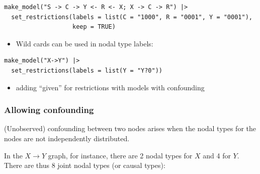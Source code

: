 \documentclass[
  article]{jss}
\providecommand{\tightlist}{%
  \setlength{\itemsep}{0pt}\setlength{\parskip}{0pt}}\usepackage{longtable,booktabs,array}
\begin{document}
\begin{verbatim}
make_model("S -> C -> Y <- R <- X; X -> C -> R") |>
  set_restrictions(labels = list(C = "1000", R = "0001", Y = "0001"), 
                   keep = TRUE)
\end{verbatim}

\begin{itemize}
\tightlist
\item
  Wild cards can be used in nodal type labels:
\end{itemize}

\begin{verbatim}
make_model("X->Y") |>
  set_restrictions(labels = list(Y = "Y?0"))
\end{verbatim}

\begin{itemize}
\tightlist
\item
  adding ``given'' for restrictions with models with confounding
\end{itemize}

\hypertarget{confounding}{%
\subsubsection{Allowing confounding}\label{confounding}}

(Unobserved) confounding between two nodes arises when the nodal types
for the nodes are not independently distributed.

In the \(X \rightarrow Y\) graph, for instance, there are 2 nodal types
for \(X\) and 4 for \(Y\). There are thus 8 joint nodal types (or causal
types):
\end{document}
